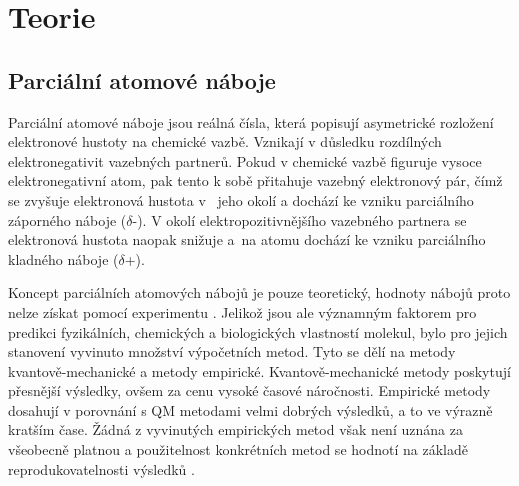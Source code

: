 \chapter{Teorie}

% 
% 
% 
% 
% 

\section{Parciální atomové náboje}

Parciální atomové náboje \cite{Atkins} jsou reálná čísla, která popisují asymetrické rozložení e\-lek\-tronové hustoty na chemické vazbě. Vznikají v důsledku rozdílných elektronegativit vazebných partnerů. Pokud v chemické vazbě figuruje vysoce elektronegativní atom, pak tento k sobě přitahuje vazebný elektronový pár, čímž se zvyšuje elektronová hustota v~ jeho okolí a dochází ke vzniku parciálního záporného náboje ($\delta$-). V okolí elektropozitivnějšího vazebného partnera se elektronová hustota naopak snižuje a~na atomu dochází ke vzniku parciálního kladného náboje ($\delta$+). 

Koncept parciálních atomových nábojů je pouze teoretický, hodnoty nábojů proto nelze získat pomocí experimentu \cite{Leach}. Jelikož jsou ale významným faktorem pro predikci fyzikálních, chemických a biologických vlastností molekul, bylo pro jejich stanovení vyvinuto množství výpočetních metod. Tyto se dělí na metody kvantově-mechanické a metody empirické. Kvantově-mechanické metody poskytují přesnější výsledky, ovšem za cenu vysoké časové náročnosti. Empirické metody dosahují v porovnání s QM metodami velmi dobrých výsledků, a to ve výrazně kratším čase. Žádná z vyvinutých empirických metod však není uznána za všeobecně platnou a použitelnost konkrétních metod se hodnotí na základě reprodukovatelnosti výsledků \cite{Gasteiger:Textbook}. 


